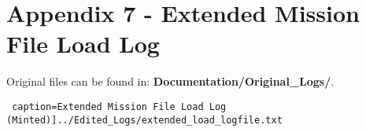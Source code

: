 \documentclass{article}
\begin{document}
\section*{Appendix 7 - Extended Mission File Load Log}

Original files can be found in: \textbf{Documentation/Original\_Logs/}.

\texttt{ caption=Extended Mission File Load Log (Minted)]{../Edited_Logs/extended_load_logfile.txt}}
\end{document}
